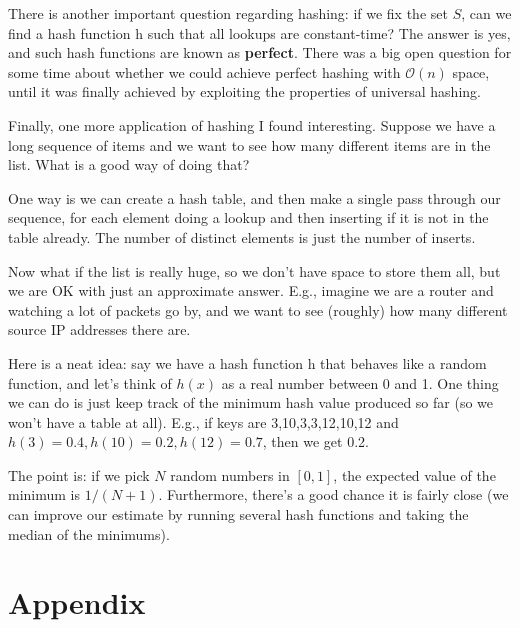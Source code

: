 \documentclass[14pt]{extreport}
\begin{document}
    \vspace{5mm}
    There is another important question regarding hashing: if we fix the set $S$, can we find a hash function h such that all lookups are constant-time? The answer is yes, and such hash functions are known as \textbf{perfect}. There was a big open question for some time about whether we could achieve perfect hashing with $\mathcal{O}(n)$ space, until it was finally achieved by exploiting the properties of universal hashing.

    \vspace{5mm}
    Finally, one more application of hashing I found interesting. Suppose we have a long sequence of items and we want to see how many different items are in the list. What is a good way of doing that?

    \vspace{5mm}
    One way is we can create a hash table, and then make a single pass through our sequence, for each
    element doing a lookup and then inserting if it is not in the table already. The number of distinct
    elements is just the number of inserts.

    \vspace{5mm}
    Now what if the list is really huge, so we don’t have space to store them all, but we are OK with just an approximate answer. E.g., imagine we are a router and watching a lot of packets go by, and we want to see (roughly) how many different source IP addresses there are.

    \vspace{5mm}
    Here is a neat idea: say we have a hash function h that behaves like a random function, and let’s think of $h(x)$ as a real number between 0 and 1. One thing we can do is just keep track of the minimum hash value produced so far (so we won’t have a table at all). E.g., if keys are 3,10,3,3,12,10,12 and $h(3) = 0.4,h(10) = 0.2,h(12) = 0.7$, then we get 0.2.

    \vspace{5mm}
    The point is: if we pick $N$ random numbers in $[0, 1]$, the expected value of the minimum is $1/(N +1)$. Furthermore, there’s a good chance it is fairly close (we can improve our estimate by running several hash functions and taking the median of the minimums).

\pagebreak
\section*{Appendix}
\end{document}
